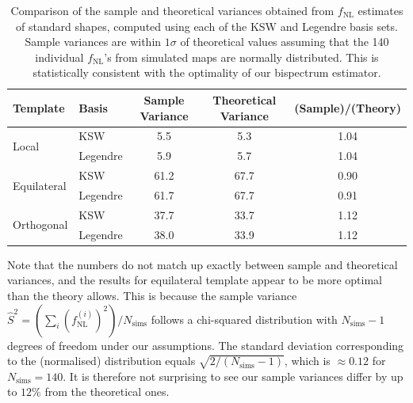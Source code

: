 \begin{table}[h]
	\caption{Comparison of the sample and theoretical variances obtained from $f_\text{NL}$ estimates of standard shapes, computed using each of the KSW and Legendre basis sets. Sample variances are within $1\sigma$ of theoretical values assuming that the 140 individual $f_\text{NL}$'s from simulated maps are normally distributed. This is statistically consistent with the optimality of our bispectrum estimator.}
	\centering
	\label{table:trio_sample_and_theory_variances}
	\renewcommand{\arraystretch}{1.5} 
	\begin{tabular}{llccc}
		\toprule
		Template & Basis & Sample Variance &  Theoretical Variance &  (Sample)/(Theory) \\
		\midrule
		\multirow{2}{*}{Local} & KSW &  5.5 &       5.3 &               1.04 \\
		& Legendre &             5.9 &                  5.7 &               1.04 \\
		\multirow{2}{*}{Equilateral} & KSW &            61.2 &                 67.7 &               0.90 \\
		& Legendre &            61.7 &                 67.7 &               0.91 \\
		\multirow{2}{*}{Orthogonal} & KSW &            37.7 &                 33.7 &               1.12 \\
		& Legendre &            38.0 &                 33.9 &               1.12 \\
		\bottomrule
	\end{tabular}
\end{table}

Note that the numbers do not match up exactly between sample and theoretical variances, and the results for equilateral template appear to be more optimal than the theory allows. This is because the sample variance $\hat{S}^2 = (\sum_i (f^{(i)}_\text{NL})^2 )/N_\text{sims}$ follows a chi-squared distribution with $N_\text{sims}-1$ degrees of freedom under our assumptions. The standard deviation corresponding to the (normalised) distribution equals $\sqrt{2/(N_\text{sims}-1)}$, which is $\approx 0.12$ for $N_\text{sims}=140$. It is therefore not surprising to see our sample variances differ by up to $12\%$ from the theoretical ones. 

